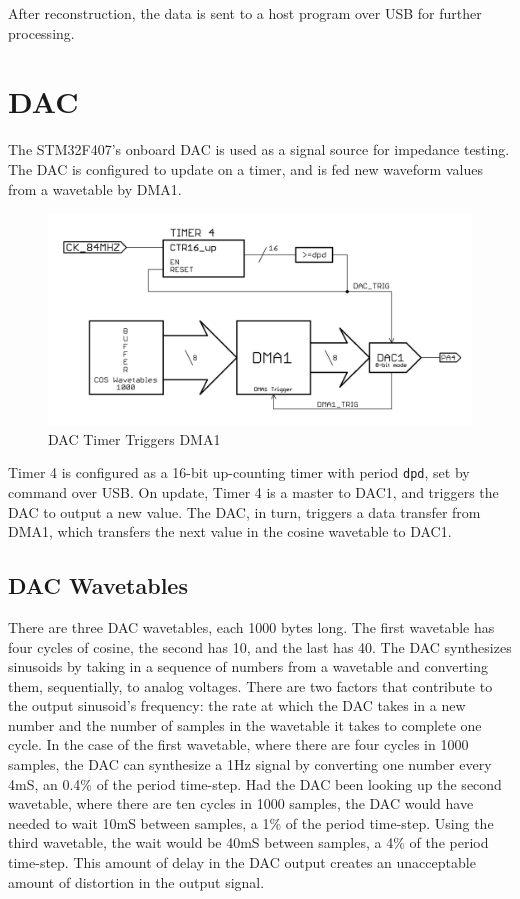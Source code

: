 \documentclass[11pt,twoside]{mitthesis}
\begin{document}
After reconstruction, the data is sent to a host program over USB for further processing.

\section{DAC}

The STM32F407's onboard DAC is used as a signal source for impedance testing.
The DAC is configured to update on a timer, and is fed new waveform values from a wavetable by DMA1.

\begin{figure}[H]
  \begin{center}
      \includegraphics[width=1\textwidth]{../DAC-DMA.png}
      \caption{DAC Timer Triggers DMA1}
  \end{center}
\end{figure}


Timer 4 is configured as a 16-bit up-counting timer with period \texttt{dpd}, set by command over USB.
On update, Timer 4 is a master to DAC1, and triggers the DAC to output a new value.
The DAC, in turn, triggers a data transfer from DMA1, which transfers the next value in the cosine wavetable to DAC1.


\subsection{DAC Wavetables}

There are three DAC wavetables, each 1000 bytes long.
The first wavetable has four cycles of cosine, the second has 10, and the last has 40.
The DAC synthesizes sinusoids by taking in a sequence of numbers from a wavetable and converting them, sequentially, to analog voltages.
There are two factors that contribute to the output sinusoid's frequency: the rate at which the DAC takes in a new number and the number of samples in the wavetable it takes to complete one cycle.
In the case of the first wavetable, where there are four cycles in 1000 samples, the DAC can synthesize a 1Hz signal by converting one number every 4mS, an 0.4\% of the period time-step.
Had the DAC been looking up the second wavetable, where there are ten cycles in 1000 samples, the DAC would have needed to wait 10mS between samples, a 1\% of the period time-step.
Using the third wavetable, the wait would be 40mS between samples, a 4\% of the period time-step.
This amount of delay in the DAC output creates an unacceptable amount of distortion in the output signal.
\end{document}
